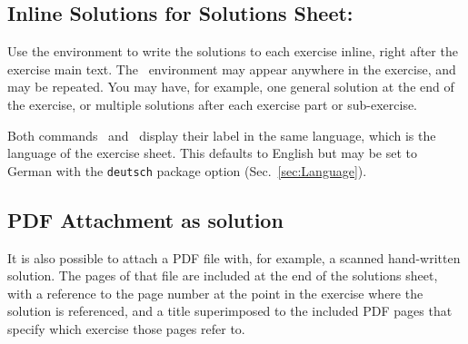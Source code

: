 \documentclass[11pt,a4paper]{article}
\begin{document}
\subsection{Inline Solutions for Solutions Sheet: }

Use the  environment to write the solutions to each exercise inline,
right after the exercise main text. 
The~ environment may appear anywhere in the exercise, and may be
repeated. You may have, for example, one general solution at the end of the exercise, or
multiple solutions after each exercise part or sub-exercise.



\begin{pkgnotice}
  Both commands~ and~ display their label in the same
  language, which is the language of the exercise sheet. This defaults to English but may
  be set to German with the {\tt deutsch} package option (Sec.~\ref{sec:Language}).
\end{pkgnotice}


\subsection{PDF Attachment as solution}

It is also possible to attach a PDF file with, for example, a scanned hand-written
solution. The pages of that file are included at the end of the solutions sheet, with a
reference to the page number at the point in the exercise where the solution is
referenced, and a title superimposed to the included PDF pages that specify which exercise
those pages refer to.
\end{document}
